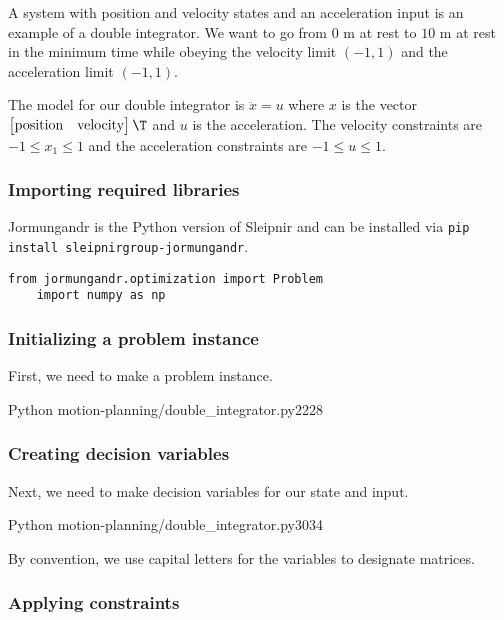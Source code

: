 A system with position and velocity states and an acceleration input is an
example of a double integrator. We want to go from $0$ m at rest to $10$ m at
rest in the minimum time while obeying the velocity limit $(-1, 1)$ and the
acceleration limit $(-1, 1)$.

The model for our double integrator is $\ddot{x} = u$ where $x$ is the vector
$\begin{bmatrix}\text{position} & \text{velocity}\end{bmatrix}\T$ and $u$ is the
acceleration. The velocity constraints are $-1 \leq x_1 \leq 1$ and the
acceleration constraints are $-1 \leq u \leq 1$.

\subsubsection{Importing required libraries}

Jormungandr is the Python version of Sleipnir and can be installed via
\texttt{pip install sleipnirgroup-jormungandr}.
\begin{code}
  \begin{lstlisting}[style=customPython]
    from jormungandr.optimization import Problem
    import numpy as np
  \end{lstlisting}
\end{code}

\subsubsection{Initializing a problem instance}

First, we need to make a problem instance.
\begin{coderemotesubset}{Python}
  {motion-planning/double_integrator.py}{22}{28}
\end{coderemotesubset}

\subsubsection{Creating decision variables}

Next, we need to make decision variables for our state and input.
\begin{coderemotesubset}{Python}
  {motion-planning/double_integrator.py}{30}{34}
\end{coderemotesubset}

By convention, we use capital letters for the variables to designate
matrices.

\subsubsection{Applying constraints}

